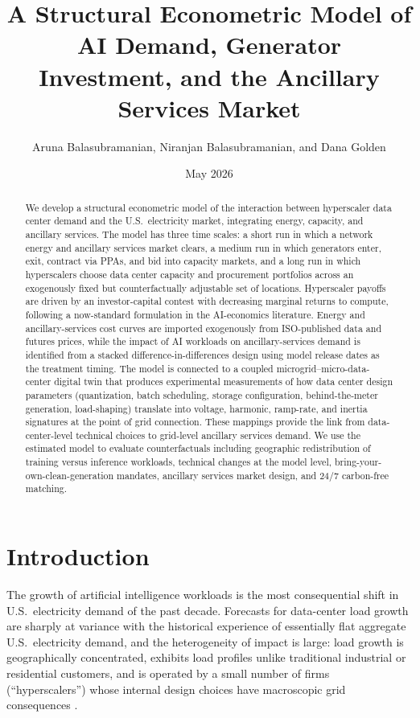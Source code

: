 \documentclass[12pt,letterpaper]{article}
\title{A Structural Econometric Model of AI Demand, Generator Investment,
and the Ancillary Services Market}
\author{Aruna Balasubramanian, Niranjan Balasubramanian, and Dana Golden}
\date{May 2026}
\begin{document}
\maketitle

\begin{abstract}
\noindent We develop a structural econometric model of the interaction between
hyperscaler data center demand and the U.S.\ electricity market, integrating
energy, capacity, and ancillary services. The model has three time scales: a
short run in which a network energy and ancillary services market clears, a
medium run in which generators enter, exit, contract via PPAs, and bid into
capacity markets, and a long run in which hyperscalers choose data center
capacity and procurement portfolios across an exogenously fixed but
counterfactually adjustable set of locations. Hyperscaler payoffs are driven
by an investor-capital contest with decreasing marginal returns to compute,
following a now-standard formulation in the AI-economics literature.
Energy and ancillary-services cost curves are imported exogenously from
ISO-published data and futures prices, while the impact of AI workloads on
ancillary-services demand is identified from a stacked difference-in-differences
design using model release dates as the treatment timing.
The model is connected to a coupled microgrid--micro-data-center digital twin
that produces experimental measurements of how data center design parameters
(quantization, batch scheduling, storage configuration, behind-the-meter
generation, load-shaping) translate into voltage, harmonic, ramp-rate, and
inertia signatures at the point of grid connection. These mappings provide
the link from data-center-level technical choices to grid-level ancillary
services demand. We use the estimated model to evaluate counterfactuals
including geographic redistribution of training versus inference workloads,
technical changes at the model level, bring-your-own-clean-generation mandates,
ancillary services market design, and 24/7 carbon-free matching.
\end{abstract}

\newpage

\section{Introduction}
\label{sec:intro}

The growth of artificial intelligence workloads is the most consequential
shift in U.S.\ electricity demand of the past decade. Forecasts for
data-center load growth are sharply at variance with the historical experience
of essentially flat aggregate U.S.\ electricity demand, and the heterogeneity
of impact is large: load growth is geographically concentrated, exhibits
load profiles unlike traditional industrial or residential customers, and is
operated by a small number of firms (``hyperscalers'') whose internal design
choices have macroscopic grid consequences \citep{shehabi2024,epri2024,
gridstrategies2025}.
\end{document}

